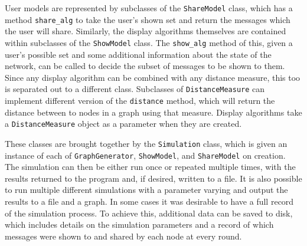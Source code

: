 \documentclass[bsc,frontabs,twoside,singlespacing,parskip,deptreport]{infthesis}     %
\begin{document}
User models are represented by subclasses of the \texttt{ShareModel} class, which has a method \texttt{share\_alg} to take the user's shown set and return the messages which the user will share. Similarly, the display algorithms themselves are contained within subclasses of the \texttt{ShowModel} class. The \texttt{show\_alg} method of this, given a user's possible set and some additional information about the state of the network, can be called to decide the subset of messages to be shown to them. Since any display algorithm can be combined with any distance measure, this too is separated out to a different class. Subclasses of \texttt{DistanceMeasure} can implement different version of the \texttt{distance} method, which will return the distance between to nodes in a graph using that measure. Display algorithms take a \texttt{DistanceMeasure} object as a parameter when they are created.

These classes are brought together by the \texttt{Simulation} class, which is given an instance of each of \texttt{GraphGenerator}, \texttt{ShowModel}, and \texttt{ShareModel} on creation. The simulation can then be either run once or repeated multiple times, with the results returned to the program and, if desired, written to a file. It is also possible to run multiple different simulations with a parameter varying and output the results to a file and a graph. In some cases it was desirable to have a full record of the simulation process. To achieve this, additional data can be saved to disk, which includes details on the simulation parameters and a record of which messages were shown to and shared by each node at every round.
\end{document}
